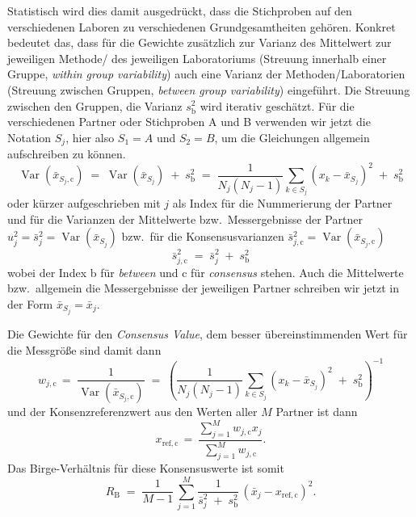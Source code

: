 Statistisch wird dies damit ausgedrückt, dass die Stichproben auf den verschiedenen
Laboren zu verschiedenen Grundgesamtheiten gehören.
Konkret bedeutet das, dass für die Gewichte zusätzlich zur Varianz des Mittelwert
zur jeweiligen Methode/ des jeweiligen Laboratoriums
(Streuung innerhalb einer Gruppe, \textsl{within group variability})
auch eine Varianz der Methoden/Laboratorien (Streuung zwischen Gruppen,
\textsl{between group variability}) eingeführt.
Die Streuung zwischen den Gruppen, die Varianz $s^2_\mathrm{b}$ wird
iterativ geschätzt. Für die verschiedenen Partner oder Stichproben A und B
verwenden wir jetzt die Notation $S_j$, hier also $S_1 = A$ und $S_2 = B$, um
die Gleichungen allgemein aufschreiben zu können.
\begin{equation*}
\operatorname{Var}(\bar x_{S_j,\mathrm{c}}) \; = \;
\operatorname{Var}(\bar x_{S_j}) \; + \; s^2_\mathrm{b} \; = \;
\frac{1}{N_j (N_j - 1)} \sum\limits_{k \in S_j}
\left( x_{k} - \bar x_{S_j} \right)^2 
\; + \; s^2_\mathrm{b}
\end{equation*}
oder kürzer aufgeschrieben mit $j$ als Index für die Nummerierung der Partner
und für die Varianzen der Mittelwerte bzw.\ Messergebnisse 
der Partner
$u^2_j = \bar s^2_j = \operatorname{Var}(\bar x_{S_j})$
bzw.\ für die Konsensusvarianzen
$\bar s^2_{j,\mathrm{c}} = \operatorname{Var}(\bar x_{S_j,\mathrm{c}})$
\begin{equation}
\bar s^2_{j,\mathrm{c}} \; = \; \bar s^2_j \; + \; s^2_\mathrm{b}
\label{eq:consensusVariability}
\end{equation}
wobei der Index b für \textsl{between} und c für \textsl{consensus}
stehen. Auch die Mittelwerte bzw.\ allgemein die Messergebnisse der
jeweiligen Partner schreiben wir jetzt in der Form $\bar x_{S_j} = \bar x_j$.

Die Gewichte für den \textsl{Consensus Value}, dem besser übereinstimmenden
Wert für die Messgröße sind damit dann
\begin{equation}
w_{j,\mathrm{c}} \, = \; \frac{1}{\operatorname{Var}(\bar x_{S_j,\mathrm{c}})} \; = \;
\left(\frac{1}{N_j (N_j - 1)} \sum\limits_{k \in S_j}
\left( x_{k} - \bar x_{S_j} \right)^2 
\; + \; s^2_\mathrm{b} \right)^{-1}
\label{eq:consensusWeights}
\end{equation}
und der Konsenzreferenzwert aus den Werten aller $M$ Partner ist dann
\begin{equation}
x_\mathrm{ref, c} \, = \, 
\frac{\sum\limits_{j=1}^M w_{j,\mathrm{c}} x_j}{\sum\limits_{j=1}^M w_{j,\mathrm{c}} }.
\label{eq:consensusMean}
\end{equation}
Das Birge-Verhältnis für diese Konsensuswerte ist somit
\begin{equation}
R_\mathrm{B} \; = \; \frac{1}{M-1} \, \sum\limits_{j=1}^M
\frac{1}{\bar s^2_j \; + \; s^2_\mathrm{b}} \, \left(\bar x_j - x_\mathrm{ref, c}\right)^2.
\end{equation}

